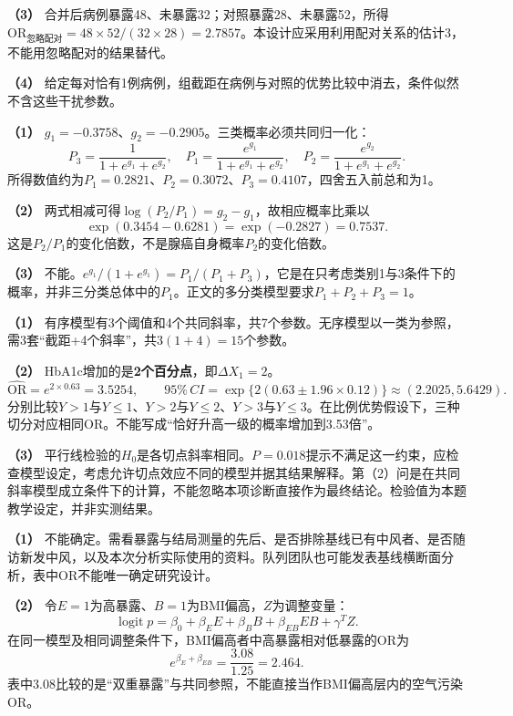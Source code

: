 \textbf{（3）} 合并后病例暴露48、未暴露32；对照暴露28、未暴露52，所得\(\mathrm{OR}_{\text{忽略配对}}=48\times52/(32\times28)=2.7857\)。本设计应采用利用配对关系的估计3，不能用忽略配对的结果替代。

\textbf{（4）} 给定每对恰有1例病例，组截距在病例与对照的优势比较中消去，条件似然不含这些干扰参数。




\textbf{（1）} \(g_1=-0.3758\)、\(g_2=-0.2905\)。三类概率必须共同归一化：
\[P_3=\frac1{1+e^{g_1}+e^{g_2}},\quad
P_1=\frac{e^{g_1}}{1+e^{g_1}+e^{g_2}},\quad
P_2=\frac{e^{g_2}}{1+e^{g_1}+e^{g_2}}.\]
所得数值约为\(P_1=0.2821\)、\(P_2=0.3072\)、\(P_3=0.4107\)，四舍五入前总和为1。

\textbf{（2）} 两式相减可得\(\log(P_2/P_1)=g_2-g_1\)，故相应概率比乘以
\[\exp(0.3454-0.6281)=\exp(-0.2827)=0.7537.\]
这是\(P_2/P_1\)的变化倍数，不是腺癌自身概率\(P_2\)的变化倍数。

\textbf{（3）} 不能。\(e^{g_1}/(1+e^{g_1})=P_1/(P_1+P_3)\)，它是在只考虑类别1与3条件下的概率，并非三分类总体中的\(P_1\)。正文的多分类模型要求\(P_1+P_2+P_3=1\)。




\textbf{（1）} 有序模型有3个阈值和4个共同斜率，共7个参数。无序模型以一类为参照，需3套“截距+4个斜率”，共\(3(1+4)=15\)个参数。

\textbf{（2）} HbA1c增加的是\textbf{2个百分点}，即\(\Delta X_1=2\)。
\[\widehat{\mathrm{OR}}=e^{2\times0.63}=3.5254,\qquad
95\%\,CI=\exp\{2(0.63\pm1.96\times0.12)\}
\approx(2.2025,5.6429).\]
分别比较\(Y>1\)与\(Y\le1\)、\(Y>2\)与\(Y\le2\)、\(Y>3\)与\(Y\le3\)。在比例优势假设下，三种切分对应相同OR。不能写成“恰好升高一级的概率增加到3.53倍”。

\textbf{（3）} 平行线检验的\(H_0\)是各切点斜率相同。\(P=0.018\)提示不满足这一约束，应检查模型设定，考虑允许切点效应不同的模型并据其结果解释。第（2）问是在共同斜率模型成立条件下的计算，不能忽略本项诊断直接作为最终结论。检验值为本题教学设定，并非实测结果。




\textbf{（1）} 不能确定。需看暴露与结局测量的先后、是否排除基线已有中风者、是否随访新发中风，以及本次分析实际使用的资料。队列团队也可能发表基线横断面分析，表中OR不能唯一确定研究设计。

\textbf{（2）} 令\(E=1\)为高暴露、\(B=1\)为BMI偏高，\(Z\)为调整变量：
\[\operatorname{logit}p=\beta_0+\beta_EE+\beta_BB+\beta_{EB}EB+\gamma^TZ.\]
在同一模型及相同调整条件下，BMI偏高者中高暴露相对低暴露的OR为
\[e^{\beta_E+\beta_{EB}}=\frac{3.08}{1.25}=2.464.\]
表中3.08比较的是“双重暴露”与共同参照，不能直接当作BMI偏高层内的空气污染OR。

